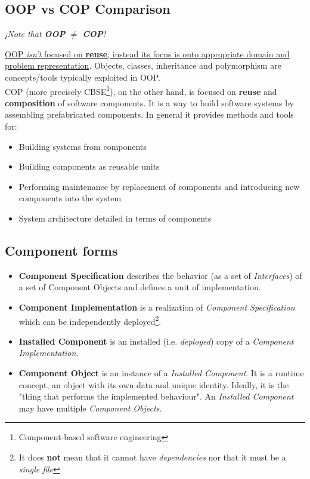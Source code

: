 \subsection{OOP vs COP Comparison}
\begin{center}
\textit{¡Note that \textbf{OOP} $\neq$ \textbf{COP}!}
\end{center}

\ul{OOP \textit{isn't} focused on \textbf{reuse}, instead its focus is onto appropriate domain and problem representation}. Objects, classes, inheritance and polymorphism are concepts/tools typically exploited in OOP.\\
COP (more precisely CBSE\footnote{Component-based software engineering}), on the other hand, is focused on \textbf{reuse} and \textbf{composition} of software components. It is a way to build software systems by assembling prefabricated components.
In general it provides methods and tools for:
\begin{itemize}
	\item Building systems from components
	\item Building components as reusable units
	\item Performing maintenance by replacement of
	      components and introducing new components
	      into the system
	\item System architecture detailed in terms of
	      components
\end{itemize}

\subsection{Component forms}
\begin{itemize}
    \item \textbf{Component Specification} describes the behavior (as a set of \textit{Interfaces}) of a set of Component Objects and defines a unit of implementation.
    \item \textbf{Component Implementation} is a realization of \textit{Component Specification} which can be independently deployed\footnote{It does \textbf{not} mean that it cannot have \textit{dependencies} nor that it must be a \textit{single file}}.
    \item \textbf{Installed Component} is an installed (i.e. \textit{deployed}) copy of a \textit{Component Implementation}.
    \item \textbf{Component Object} is an instance of a \textit{Installed Component}.
    It is a runtime concept, an object with its own data and unique identity.
    Ideally, it is the "thing that performs the implemented behaviour".
    An \textit{Installed Component} may have multiple \textit{Component Objects}.
\end{itemize}

